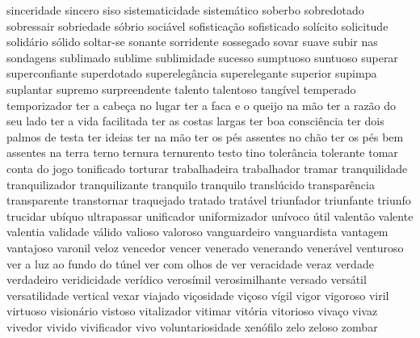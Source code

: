 sinceridade sincero siso sistematicidade sistem\'{a}tico soberbo sobredotado sobressair sobriedade s\'{o}brio soci\'{a}vel sofistica\c{c}\~ao sofisticado sol\'{i}cito solicitude solid\'{a}rio s\'{o}lido soltar-se sonante sorridente sossegado sovar suave subir nas sondagens sublimado sublime sublimidade sucesso sumptuoso suntuoso superar superconfiante superdotado supereleg\^{a}ncia superelegante superior supimpa suplantar supremo surpreendente talento talentoso tang\'{i}vel temperado temporizador ter a cabe\c{c}a no lugar ter a faca e o queijo na m\~ao ter a raz\~ao do seu lado ter a vida facilitada ter as costas largas ter boa consci\^{e}ncia ter dois palmos de testa ter ideias ter na m\~ao ter os p\'{e}s assentes no ch\~ao ter os p\'{e}s bem assentes na terra terno ternura ternurento testo tino toler\^{a}ncia tolerante tomar conta do jogo tonificado torturar trabalhadeira trabalhador tramar tranquilidade tranquilizador tranquilizante tranquilo tranquilo transl\'{u}cido transpar\^{e}ncia transparente transtornar traquejado tratado trat\'{a}vel triunfador triunfante triunfo trucidar ub\'{i}quo ultrapassar unificador uniformizador un\'{i}voco \'{u}til valent\~ao valente valentia validade v\'{a}lido valioso valoroso vanguardeiro vanguardista vantagem vantajoso varonil veloz vencedor vencer venerado venerando vener\'{a}vel venturoso ver a luz ao fundo do t\'{u}nel ver com olhos de ver veracidade veraz verdade verdadeiro veridicidade ver\'{i}dico veros\'{i}mil verosimilhante versado vers\'{a}til versatilidade vertical vexar viajado vi\c{c}osidade vi\c{c}oso v\'{i}gil vigor vigoroso viril virtuoso vision\'{a}rio vistoso vitalizador vitimar vit\'{o}ria vitorioso viva\c{c}o vivaz vivedor vivido vivificador vivo voluntariosidade xen\'{o}filo zelo zeloso zombar 